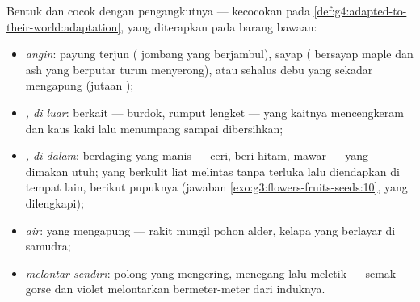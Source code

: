 \begin{proposition}\label{prop:g6:how-plants-spread:builds}
Bentuk  dan  cocok dengan pengangkutnya --- kecocokan pada
\cref{def:g4:adapted-to-their-world:adaptation}, yang diterapkan pada
barang bawaan:
\begin{itemize}
  \item \emph{angin}: payung terjun ( jombang yang berjambul),
        sayap ( bersayap maple dan ash yang berputar turun
        menyerong), atau  sehalus debu yang sekadar mengapung
        (jutaan  );
  \item \emph{, di luar}:  berkait --- burdok, rumput lengket
        --- yang kaitnya mencengkeram  dan kaus kaki lalu
        menumpang sampai dibersihkan;
  \item \emph{, di dalam}:  berdaging yang manis --- ceri,
        beri hitam,  mawar --- yang dimakan utuh;  yang
        berkulit liat melintas tanpa terluka lalu diendapkan di tempat
        lain, berikut pupuknya
        (jawaban \cref{exo:g3:flowers-fruits-seeds:10}, yang
        dilengkapi);
  \item \emph{air}:  yang mengapung --- rakit mungil pohon alder,
         kelapa yang berlayar di samudra;
  \item \emph{melontar sendiri}: polong yang mengering, menegang lalu
        meletik --- semak gorse dan  violet melontarkan 
        bermeter-meter dari induknya.
\end{itemize}
\end{proposition}
\admitted

